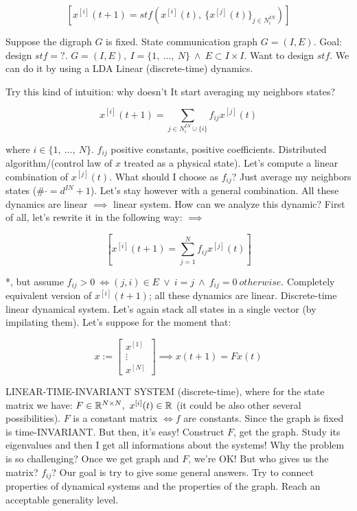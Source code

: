 \[
	[x^{[i]}(t+1) = stf(x^{[i]}(t),\ \{x^{[j]}(t)\}_{j\in N_i^{IN}})]
\]

Suppose the digraph $G$ is fixed. State communication graph $G=(I,E)$. Goal: design $stf=?$.
$G=(I,E),\ I=\{1,\ \dots,\ N\}\ \land\ E\subset I\times I$. Want to design $stf$. We can do it by using a LDA Linear (discrete-time) dynamics.

Try this kind of intuition: why doesn't It start averaging my neighbors states?

\[
	x^{[i]}(t+1) = \sum_{j\in N_i^{IN}\cup\{i\}}{f_{ij}x^{[j]}(t)}
\]

where $i\in \{1,\ \dots,\ N\}$. $f_{ij}$ positive constants, positive coefficients.
Distributed algorithm/(control law of $x$ treated as a physical state). Let's compute a linear combination of $x^{[j]}(t)$. What should I choose as $f_{ij}$? Just average my neighbors states ($\# \mathord{\cdot} = d^{IN}+1$). Let's stay however with a general combination. All these dynamics are linear $\implies$ linear system. How can we analyze this dynamic? First of all, let's rewrite it in the following way: $\implies$

\[
	[x^{[i]}(t+1) = \sum_{j=1}^N{f_{ij}x^{[j]}(t)}]
\]

*, but assume $f_{ij}>0\ \iff (j,i)\in E\ \lor\ i=j\ \land\ f_{ij}=0\ otherwise$. Completely equivalent version of $x^{[i]}(t+1)$; all these dynamics are linear. Discrete-time linear dynamical system. Let's again stack all states in a single vector (by impilating them). Let's suppose for the moment that:

\[
	x := \begin{bmatrix}x^{[1]}\\ \vdots\\ x^{[N]}\end{bmatrix} \implies x(t+1)=Fx(t)
\]

LINEAR-TIME-INVARIANT SYSTEM (discrete-time), where for the state matrix we have: $F \in \R^{N\times N},\ x^{[i]}(t) \in \R$ (it could be also other several possibilities). $F$ is a constant matrix $\iff f$ are constants. Since the graph is fixed is time-INVARIANT. But then, it's easy! Construct $F$, get the graph. Study its eigenvalues and then I get all informations about the systems! Why the problem is so challenging? Once we get graph and $F$, we're OK! But who gives us the matrix? $f_{ij}$? Our goal is try to give some general answers. Try to connect properties of dynamical systems and the properties of the graph. Reach an acceptable generality level.

